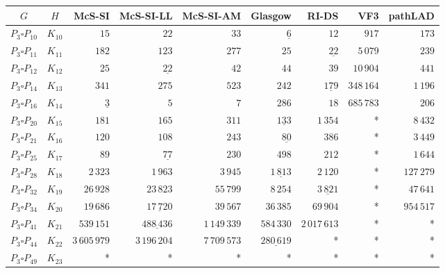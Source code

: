
\begin{tabular}{ccrrrrrrr}
    \toprule
    {$G$} & {$H$} & {McS-SI} & {McS-SI-LL} & {McS-SI-AM} & Glasgow & RI-DS & VF3 & pathLAD \\ 
    \midrule

$P_3\square P_{10}$ & $K_{10}$ & $15$ & $22$ & $33$ & $\underline{6}$ & $12$ & $917$ & $173$\\
$P_3\square P_{11}$ & $K_{11}$ & $182$ & $123$ & $277$ & $25$ & $\underline{22}$ & $5\,079$ & $239$\\
$P_3\square P_{12}$ & $K_{12}$ & $25$ & $\underline{22}$ & $42$ & $44$ & $39$ & $10\,904$ & $441$\\
$P_3\square P_{14}$ & $K_{13}$ & $341$ & $275$ & $523$ & $242$ & $\underline{179}$ & $348\,164$ & $1\,196$\\
$P_3\square P_{16}$ & $K_{14}$ & $\underline{3}$ & $5$ & $7$ & $286$ & $18$ & $685\,783$ & $206$\\
$P_3\square P_{20}$ & $K_{15}$ & $181$ & $165$ & $311$ & $\underline{133}$ & $1\,354$ & * & $8\,432$\\
$P_3\square P_{21}$ & $K_{16}$ & $120$ & $108$ & $243$ & $\underline{80}$ & $386$ & * & $3\,449$\\
$P_3\square P_{25}$ & $K_{17}$ & $89$ & $\underline{77}$ & $230$ & $498$ & $212$ & * & $1\,644$\\
$P_3\square P_{28}$ & $K_{18}$ & $2\,323$ & $1\,963$ & $3\,945$ & $\underline{1\,813}$ & $2\,120$ & * & $127\,279$\\
$P_3\square P_{32}$ & $K_{19}$ & $26\,928$ & $23\,823$ & $55\,799$ & $8\,254$ & $\underline{3\,821}$ & * & $47\,641$\\
$P_3\square P_{34}$ & $K_{20}$ & $19\,686$ & $\underline{17\,720}$ & $39\,567$ & $36\,385$ & $69\,904$ & * & $954\,517$\\
$P_3\square P_{41}$ & $K_{21}$ & $539\,151$ & $\underline{488\,436}$ & $1\,149\,339$ & $584\,330$ & $2\,017\,613$ & * & *\\
$P_3\square P_{44}$ & $K_{22}$ & $3\,605\,979$ & $3\,196\,204$ & $7\,709\,573$ & $\underline{280\,619}$ & * & * & *\\
$P_3\square P_{49}$ & $K_{23}$ & * & * & * & * & * & * & *\\

    \bottomrule
\end{tabular}

